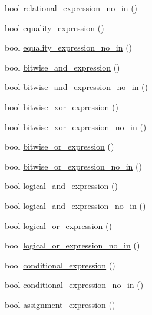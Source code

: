 \begin{DoxyCompactItemize}
\item 
bool \hyperlink{class_expression_parser_af0f65db794d4574e3cf5b2467374380c}{relational\+\_\+expression\+\_\+no\+\_\+in} ()
\item 
bool \hyperlink{class_expression_parser_a42c86b61b3a3a50fe672772fe67d3802}{equality\+\_\+expression} ()
\item 
bool \hyperlink{class_expression_parser_ae9ec4805a42f2790e691a1bebabe4c02}{equality\+\_\+expression\+\_\+no\+\_\+in} ()
\item 
bool \hyperlink{class_expression_parser_af7d008b8db0af8657da54491c5af366d}{bitwise\+\_\+and\+\_\+expression} ()
\item 
bool \hyperlink{class_expression_parser_a65470e8ab49802226e525617463b4566}{bitwise\+\_\+and\+\_\+expression\+\_\+no\+\_\+in} ()
\item 
bool \hyperlink{class_expression_parser_adbe0b770341518a13f472a9545dbb71b}{bitwise\+\_\+xor\+\_\+expression} ()
\item 
bool \hyperlink{class_expression_parser_a8e704112decb6c1d75e640c5974a3e7b}{bitwise\+\_\+xor\+\_\+expression\+\_\+no\+\_\+in} ()
\item 
bool \hyperlink{class_expression_parser_a33799af9f0d88c484ddffcce37fb5eaa}{bitwise\+\_\+or\+\_\+expression} ()
\item 
bool \hyperlink{class_expression_parser_a7f5d32d2b0f91e63b8ced00933f790cc}{bitwise\+\_\+or\+\_\+expression\+\_\+no\+\_\+in} ()
\item 
bool \hyperlink{class_expression_parser_a49c3de1cac65e795b76c292e72393324}{logical\+\_\+and\+\_\+expression} ()
\item 
bool \hyperlink{class_expression_parser_a142f2c3a5c854c0749b9a2bc5491e0ab}{logical\+\_\+and\+\_\+expression\+\_\+no\+\_\+in} ()
\item 
bool \hyperlink{class_expression_parser_a7d122aa924e11bc04e49b45f8a649721}{logical\+\_\+or\+\_\+expression} ()
\item 
bool \hyperlink{class_expression_parser_a395c01aaeb1b3e3b255c4cbd8a895c42}{logical\+\_\+or\+\_\+expression\+\_\+no\+\_\+in} ()
\item 
bool \hyperlink{class_expression_parser_ad31f525a203b380ebcbab8bb2644213e}{conditional\+\_\+expression} ()
\item 
bool \hyperlink{class_expression_parser_aa689156ed203f3b65b4f9a948808cf11}{conditional\+\_\+expression\+\_\+no\+\_\+in} ()
\item 
bool \hyperlink{class_expression_parser_a86cc36a7882e2e72b6480f42323e1201}{assignment\+\_\+expression} ()

\end{DoxyCompactItemize}
